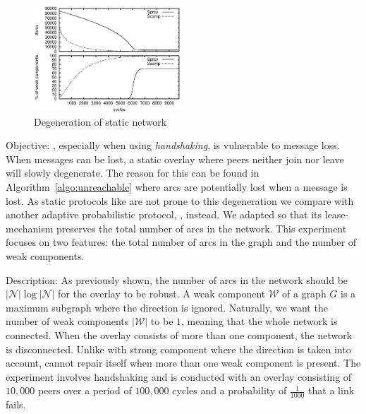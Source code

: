 \begin{figure}
  \centering \includegraphics[width=0.49\textwidth]{img/degen.eps}
  \caption{\label{fig:degen}Degeneration of static network} \end{figure}

\begin{asparadesc} \item[Objective:] \SCAMPLON{}, especially when using
        \emph{handshaking}, is vulnerable to message loss. When messages can
        be lost, a static \SCAMPLON{} overlay where peers neither join
        nor leave will slowly degenerate.
        The reason for this can be found in Algorithm~\ref{algo:unreachable} 
        where arcs are potentially lost when a message is lost.
        As static protocols like \CYCLON{} are not prone to this degeneration
        we compare with another adaptive probabilistic protocol,
        \SCAMP{}, instead. We adapted \SCAMP{} so that its lease-mechanism preserves
        the total number of arcs in the network.
        This experiment focuses on two features: the total number of arcs in the 
        graph and the number of weak components.
\item[Description:]
    As previously shown, the number of arcs in the network should be
    $|\mathcal{N}|\log{|\mathcal{N}|}$ for the overlay to be robust. A weak
    component $\mathcal{W}$ of a graph $G$ is a maximum subgraph where the direction
    is ignored.
    Naturally, we want the number of weak components $|\mathcal{W}|$ to be $1$,
    meaning that the whole network is connected.
    When the overlay consists of more than one component, the network is disconnected.
    Unlike with strong component where the direction is taken into account, \SCAMPLON{}
    cannot repair itself when more than one weak component is present.
    The experiment involves handshaking and is conducted with an overlay consisting
    of $10,000$ peers over a period of $100,000$ cycles and a probability of
    $\frac{1}{1000}$ that a link fails. 


\end{asparadesc}
